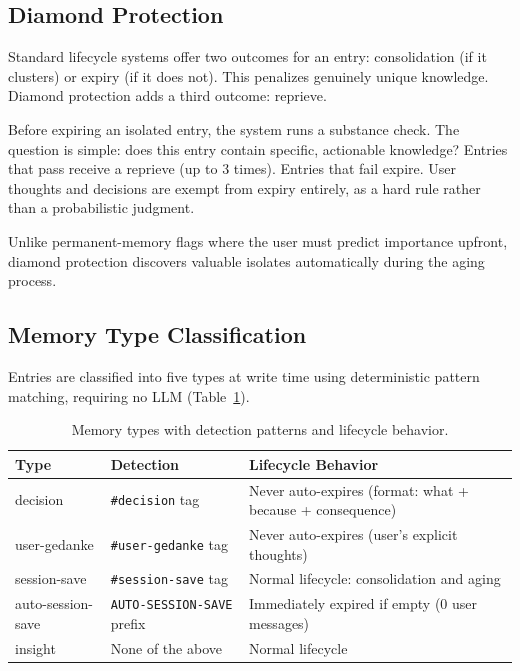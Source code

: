 \documentclass[11pt,a4paper]{article}
\begin{document}
\subsection{Diamond Protection}

Standard lifecycle systems offer two outcomes for an entry: consolidation (if it clusters) or expiry (if it does not).
This penalizes genuinely unique knowledge.
Diamond protection adds a third outcome: reprieve.

Before expiring an isolated entry, the system runs a substance check.
The question is simple: does this entry contain specific, actionable knowledge?
Entries that pass receive a reprieve (up to 3 times).
Entries that fail expire.
User thoughts and decisions are exempt from expiry entirely, as a hard rule rather than a probabilistic judgment.

Unlike permanent-memory flags where the user must predict importance upfront, diamond protection discovers valuable isolates automatically during the aging process.


\subsection{Memory Type Classification}

Entries are classified into five types at write time using deterministic pattern matching, requiring no LLM (Table~\ref{tab:types}).

\begin{table}[h]
\centering
\caption{Memory types with detection patterns and lifecycle behavior.}
\label{tab:types}
\small
\begin{tabularx}{\textwidth}{llX}
\toprule
\textbf{Type} & \textbf{Detection} & \textbf{Lifecycle Behavior} \\
\midrule
decision & \texttt{\#decision} tag & Never auto-expires (format: what + because + consequence) \\
user-gedanke & \texttt{\#user-gedanke} tag & Never auto-expires (user's explicit thoughts) \\
session-save & \texttt{\#session-save} tag & Normal lifecycle: consolidation and aging \\
auto-session-save & \texttt{AUTO-SESSION-SAVE} prefix & Immediately expired if empty (0 user messages) \\
insight & None of the above & Normal lifecycle \\
\bottomrule
\end{tabularx}
\end{table}
\end{document}
